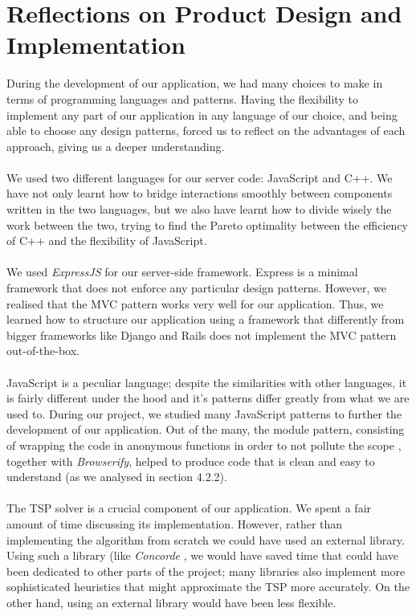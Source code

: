 \documentclass[a4paper, 10pt]{report}
\begin{document}
\section{Reflections on Product Design and Implementation}
During the development of our application, we had many choices to make in terms of programming languages and patterns. Having the flexibility to implement any part of our application in any language of our choice, and being able to choose any design patterns, forced us to reflect on the advantages of each approach, giving us a deeper understanding.
\\\\
We used two different languages for our server code: JavaScript and C++. We have not only learnt how to bridge interactions smoothly between components written in the two languages, but we also have learnt how to divide wisely the work between the two, trying to find the Pareto optimality between the efficiency of C++ and the flexibility of JavaScript.
\\\\
We used \textit{ExpressJS} for our server-side framework. Express is a minimal framework that does not enforce any particular design patterns. However, we realised that the MVC pattern works very well for our application. Thus, we learned how to structure our application using a framework that differently from bigger frameworks like Django and Rails does not implement the MVC pattern out-of-the-box.
\\\\
JavaScript is a peculiar language; despite the similarities with other languages, it is fairly different under the hood and it’s patterns differ greatly from what we are used to. During our project, we studied many JavaScript patterns to further the development of our application. Out of the many, the module pattern, consisting of wrapping the code in anonymous functions in order to not pollute the scope \cite{module-pattern}, together with \textit{Browserify}, helped to produce code that is clean and easy to understand (as we analysed in section 4.2.2).
\\\\
The TSP solver is a crucial component of our application. We spent a fair amount of time discussing its implementation. However, rather than implementing the algorithm from scratch we could have used an external library. Using such a library (like \textit{Concorde} \cite{concorde}, we would have saved time that could have been dedicated to other parts of the project; many libraries also implement more sophisticated heuristics that might approximate the TSP more accurately. On the other hand, using an external library would have been less flexible. \\\\
\end{document}
